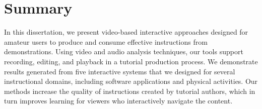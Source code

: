 \section{Summary}
In this dissertation, we present video-based interactive approaches designed for amateur users to produce and consume effective instructions from demonstrations. Using video and audio analysis techniques, our tools support recording, editing, and playback in a tutorial production process. We demonstrate results generated from five interactive systems that we designed for several instructional domains, including software applications and physical activities. Our methods increase the quality of instructions created by tutorial authors, which in turn improves learning for viewers who interactively navigate the content.
